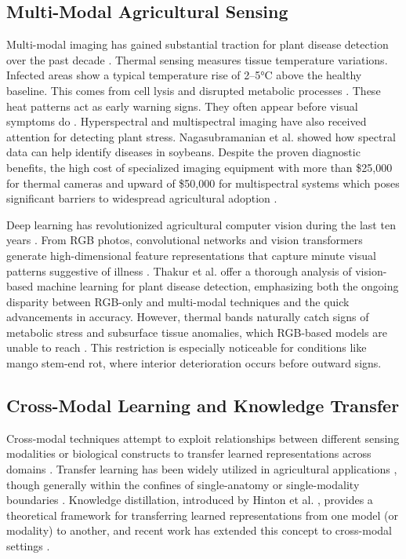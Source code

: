 \documentclass[utf8]{FrontiersinHarvard} %
\begin{document}
\subsection{Multi-Modal Agricultural Sensing}
Multi-modal imaging has gained substantial traction for plant disease detection over the past decade \cite{maimaitijiang2020,lu2020}. Thermal sensing measures tissue temperature variations.
Infected areas show a typical temperature rise of 2--5°C above the healthy baseline. This comes from cell lysis and disrupted metabolic processes \cite{mahlein2016}. These heat patterns act as early warning signs. They often appear before visual symptoms do \cite{pineda2021}. Hyperspectral and multispectral imaging have also received attention for detecting plant stress. Nagasubramanian et al. \cite{nagasubramanian2019} showed how spectral data can help identify diseases in soybeans. Despite the proven diagnostic benefits, the high cost of specialized imaging equipment with more than \$25{,}000 for thermal cameras and upward of \$50{,}000 for multispectral systems which poses significant barriers to widespread agricultural adoption \cite{sishodia2020}.

Deep learning has revolutionized agricultural computer vision during the last ten years \cite{kamilaris2018,coulibaly2022}. From RGB photos, convolutional networks and vision transformers generate high-dimensional feature representations that capture minute visual patterns suggestive of illness \cite{dosovitskiy2021,liu2022convnext}. Thakur et al. \cite{thakur2022} offer a thorough analysis of vision-based machine learning for plant disease detection, emphasizing both the ongoing disparity between RGB-only and multi-modal techniques and the quick advancements in accuracy.  However, thermal bands naturally catch signs of metabolic stress and subsurface tissue anomalies, which RGB-based models are unable to reach \cite{lu2020,pineda2021}. This restriction is especially noticeable for conditions like mango stem-end rot, where interior deterioration occurs before outward signs.

\subsection{Cross-Modal Learning and Knowledge Transfer}
Cross-modal techniques attempt to exploit relationships between different sensing modalities or biological constructs to transfer learned representations across domains \cite{zhuang2020}. Transfer learning has been widely utilized in agricultural applications \cite{chen2020_transfer,tan2018}, though generally within the confines of single-anatomy or single-modality boundaries \cite{barbedo2019}. Knowledge distillation, introduced by Hinton et al. \cite{hinton2015}, provides a theoretical framework for transferring learned representations from one model (or modality) to another, and recent work has extended this concept to cross-modal settings \cite{li2023_kd}.
\end{document}
